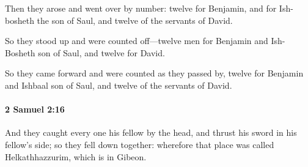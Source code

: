 			\begin{versebox}
					\item[BHS] 
					\item[ASV] Then they arose and went over by number: twelve for Benjamin, and for Ish-bosheth the son of Saul, and twelve of the servants of David.
					\item[NIV] So they stood up and were counted off—twelve men for Benjamin and Ish-Bosheth son of Saul, and twelve for David.
					\item[NRSV] So they came forward and were counted as they passed by, twelve for Benjamin and Ishbaal son of Saul, and twelve of the servants of David.
			\end{versebox}

		\paragraph{2 Samuel 2:16} %
			\label{2SAMUEL-2-16}

			And they caught every one his fellow by the head, and thrust his sword in his fellow’s side; so they fell down together: wherefore that place was called Helkathhazzurim, which is in Gibeon.

